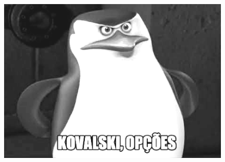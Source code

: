\documentclass[a4paper,10pt,oneside,twocolumn]{Config/milktest}
\begin{document}
\bigskip 
\hrulefill
\begin{figure}[!h]
\begin{center}
\includegraphics{mem3.png}
\vspace{-1cm}
\end{center} 
\end{figure}


% 

% 

% 

% 
\end{document}
